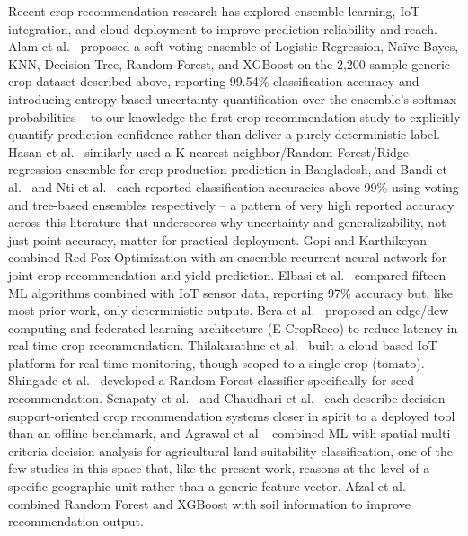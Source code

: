\documentclass[conference]{IEEEtran}
\begin{document}
Recent crop recommendation research has explored ensemble learning, IoT integration,
and cloud deployment to improve prediction reliability and reach. Alam et
al.~\cite{alam2025} proposed a soft-voting ensemble of Logistic Regression, Na\"ive
Bayes, KNN, Decision Tree, Random Forest, and XGBoost on the 2{,}200-sample generic
crop dataset described above, reporting 99.54\% classification accuracy and
introducing entropy-based uncertainty quantification over the ensemble's softmax
probabilities -- to our knowledge the first crop recommendation study to explicitly
quantify prediction confidence rather than deliver a purely deterministic label.
Hasan et al.~\cite{hasan2023} similarly used a K-nearest-neighbor/Random
Forest/Ridge-regression ensemble for crop production prediction in Bangladesh, and
Bandi et al.~\cite{bandi2023} and Nti et al.~\cite{nti2023} each reported
classification accuracies above 99\% using voting and tree-based ensembles
respectively -- a pattern of very high reported accuracy across this literature that
underscores why uncertainty and generalizability, not just point accuracy, matter for
practical deployment. Gopi and Karthikeyan~\cite{gopi2024} combined Red Fox
Optimization with an ensemble recurrent neural network for joint crop recommendation
and yield prediction. Elbasi et al.~\cite{elbasi2023} compared fifteen ML algorithms
combined with IoT sensor data, reporting 97\% accuracy but, like most prior work, only
deterministic outputs. Bera et al.~\cite{bera2023} proposed an edge/dew-computing and
federated-learning architecture (E-CropReco) to reduce latency in real-time crop
recommendation. Thilakarathne et al.~\cite{thilakarathne2023} built a cloud-based IoT
platform for real-time monitoring, though scoped to a single crop (tomato). Shingade
et al.~\cite{shingade2022} developed a Random Forest classifier specifically for seed
recommendation. Senapaty et al.~\cite{senapaty2024} and Chaudhari et
al.~\cite{chaudhari2025} each describe decision-support-oriented crop recommendation
systems closer in spirit to a deployed tool than an offline benchmark, and Agrawal et
al.~\cite{agrawal2024} combined ML with spatial multi-criteria decision analysis for
agricultural land suitability classification, one of the few studies in this space
that, like the present work, reasons at the level of a specific geographic unit
rather than a generic feature vector. Afzal et al.~\cite{afzal2025} combined Random
Forest and XGBoost with soil information to improve recommendation output.
\end{document}
